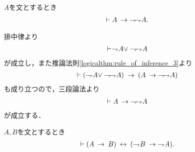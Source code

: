 	\begin{screen}
		\begin{logicalthm}[二重否定の法則の逆が成り立つ]\label{logicalthm:converse_of_law_of_double_negative}
			$A$を文とするとき
			\begin{align}
				\vdash A \rarrow \negation \negation A.
			\end{align}
		\end{logicalthm}
	\end{screen}
	
	\begin{prf}
		排中律より
		\begin{align}
			\vdash \negation A \vee \negation \negation A
		\end{align}
		が成立し，また推論法則\ref{logicalthm:rule_of_inference_3}より
		\begin{align}
			\vdash (\negation A \vee \negation \negation A)
			\rarrow (A \rarrow \negation \negation A)
		\end{align}
		も成り立つので，三段論法より
		\begin{align}
			\vdash A \rarrow \negation \negation A
		\end{align}
		が成立する．
		\QED
	\end{prf}
	
	\begin{screen}
		\begin{logicalthm}[対偶命題は同値]\label{thm:contraposition_is_true}
			$A,B$を文とするとき
			\begin{align}
				\vdash (A \rarrow B) \lrarrow (\negation B \rarrow \negation A).
			\end{align}
		\end{logicalthm}
	\end{screen}
	
